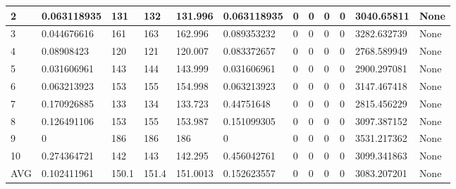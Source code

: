 \begin{table}[H]
\begin{adjustbox}{max width=460pt,keepaspectratio,angle=90}
\begin{tabular}{|l|l|l|l|l|l|l|l|l|l|l|l|}
						2           & 0.063118935 & 131        & 132        & 131.996    & 0.063118935 & 0           & 0           & 0           & 0           & 3040.65811  & None                                   \\ \hline
						3           & 0.044676616 & 161        & 163        & 162.996    & 0.089353232 & 0           & 0           & 0           & 0           & 3282.632739 & None                                   \\ \hline
						4           & 0.08908423  & 120        & 121        & 120.007    & 0.083372657 & 0           & 0           & 0           & 0           & 2768.589949 & None                                   \\ \hline
						5           & 0.031606961 & 143        & 144        & 143.999    & 0.031606961 & 0           & 0           & 0           & 0           & 2900.297081 & None                                   \\ \hline
						6           & 0.063213923 & 153        & 155        & 154.998    & 0.063213923 & 0           & 0           & 0           & 0           & 3147.467418 & None                                   \\ \hline
						7           & 0.170926885 & 133        & 134        & 133.723    & 0.44751648  & 0           & 0           & 0           & 0           & 2815.456229 & None                                   \\ \hline
						8           & 0.126491106 & 153        & 155        & 153.987    & 0.151099305 & 0           & 0           & 0           & 0           & 3097.387152 & None                                   \\ \hline
						9           & 0           & 186        & 186        & 186        & 0           & 0           & 0           & 0           & 0           & 3531.217362 & None                                   \\ \hline
						10          & 0.274364721 & 142        & 143        & 142.295    & 0.456042761 & 0           & 0           & 0           & 0           & 3099.341863 & None                                   \\ \hline
						AVG         & 0.102411961 & 150.1      & 151.4      & 151.0013   & 0.152623557 & 0           & 0           & 0           & 0           & 3083.207201 & None                                   \\ \hline
					\end{tabular}
				\end{adjustbox}	
			\end{table}	
		
